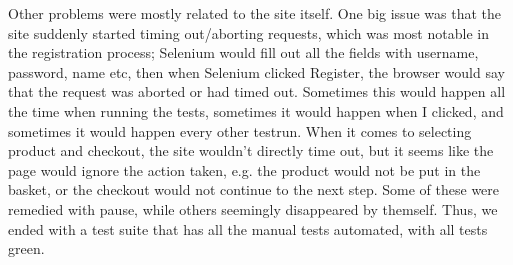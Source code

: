 \documentclass[UKenglish,12pt]{article}
\begin{document}
Other problems were mostly related to the site itself. One big issue was that the site suddenly started timing out/aborting requests, which was most notable in the registration process; Selenium would fill out all the fields with username, password, name etc, then when Selenium clicked Register, the browser would say that the request was aborted or had timed out. Sometimes this would happen all the time when running the tests, sometimes it would happen when I clicked, and sometimes it would happen every other testrun.\newline\newline
When it comes to selecting product and checkout, the site wouldn't directly time out, but it seems like the page would ignore the action taken, e.g. the product would not be put in the basket, or the checkout would not continue to the next step. Some of these were remedied with pause, while others seemingly disappeared by themself. Thus, we ended with a test suite that has all the manual tests automated, with all tests green.
\end{document}
